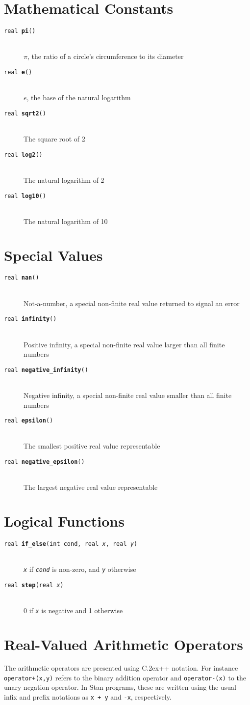 \documentclass[10pt]{report}
\newcommand{\Stan}{Stan\xspace}
\newcommand*{\Cpp}{C\raise.2ex\hbox{\footnotesize ++}\xspace} %
\newcommand{\code}[1]{{\tt #1}}
\newcommand{\fitem}[4]{\item[{\tt #1 {\bfseries #2}(#3)}]\mbox{ } \\[4pt] #4}
\newcommand{\farg}[1]{{\tt\slshape #1}}
\begin{document}
\section{Mathematical Constants}

%
\begin{description}
%
\fitem{real}{pi}{}{
  $\pi$, the ratio of a circle's circumference to its diameter}
%
\fitem{real}{e}{}{
 $e$, the base of the natural logarithm}
%
\fitem{real}{sqrt2}{}{
The square root of 2}
%
\fitem{real}{log2}{}{
The natural logarithm of 2}
%
\fitem{real}{log10}{}{
The natural logarithm of 10}
%
\end{description}

\section{Special Values}

\begin{description}
\fitem{real}{nan}{}{
Not-a-number, a special non-finite real value returned to signal an error}
%
\fitem{real}{infinity}{}{
 Positive infinity, a special non-finite real value larger than all
  finite numbers}
%
\fitem{real}{negative\_infinity}{}{ 
 Negative infinity, a special non-finite real value smaller than all
  finite numbers}
%
\fitem{real}{epsilon}{}{
The smallest positive real value representable}
%
\fitem{real}{negative\_epsilon}{}{
The largest negative real value representable}
%
\end{description}

\section{Logical Functions}

\begin{description}
%
\fitem{real}{if\_else}{int cond, real \farg{x}, real \farg{y}}{
\farg{x} if \farg{cond} is non-zero, and \farg{y} otherwise}
%
\fitem{real}{step}{real \farg{x}}{
0 if \farg{x} is negative and 1 otherwise}
%
\end{description}


\section{Real-Valued Arithmetic Operators}\label{real-valued-arithmetic-operators.section}

The arithmetic operators are presented using \Cpp notation.  For
instance \code{operator+(x,y)} refers to the binary addition operator
and \code{operator-(x)} to the unary negation operator.  In \Stan
programs, these are written using the usual infix and prefix notations
as \code{x~+~y} and \code{-x}, respectively.
\end{document}
